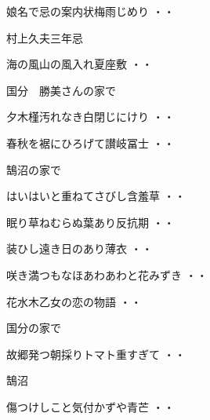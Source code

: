 \vspace{0.6cm}
\begin{shiika}娘名で忌の案内状梅雨じめり
\hfill{・・}\end{shiika}
\vspace{0.6cm}
村上久夫三年忌
\begin{shiika}海の風山の風入れ夏座敷
\hfill{・・}\end{shiika}
\vspace{0.6cm}
国分　勝美さんの家で
\begin{shiika}夕木槿汚れなき白閉じにけり
\hfill{・・}\end{shiika}
\begin{shiika}春秋を裾にひろげて讃岐冨士
\hfill{・・}\end{shiika}
\vspace{0.6cm}
鵠沼の家で
\begin{shiika}はいはいと重ねてさびし含羞草
\hfill{・・}\end{shiika}
\vspace{0.6cm}
\begin{shiika}眠り草ねむらぬ葉あり反抗期
\hfill{・・}\end{shiika}
\vspace{0.6cm}
\begin{shiika}装ひし遠き日のあり薄衣
\hfill{・・}\end{shiika}
\vspace{0.6cm}
\begin{shiika}咲き満つもなほあわあわと花みずき
\hfill{・・}\end{shiika}
\vspace{0.6cm}
\begin{shiika}花水木乙女の恋の物語
\hfill{・・}\end{shiika}
\vspace{0.6cm}
国分の家で
\begin{shiika}故郷発つ朝採りトマト重すぎて
\hfill{・・}\end{shiika}
\vspace{0.6cm}
鵠沼
\begin{shiika}傷つけしこと気付かずや青芒
\hfill{・・}\end{shiika}
